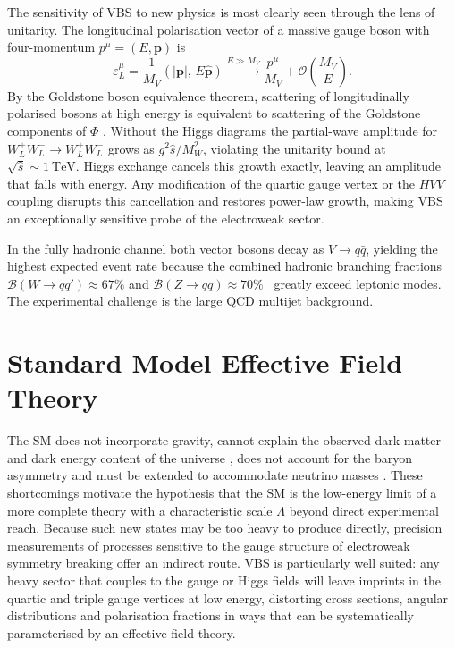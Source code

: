 The sensitivity of VBS to new physics is most clearly seen through the lens of unitarity. The longitudinal polarisation vector of a massive gauge boson with four-momentum $p^{\mu}=(E,\mathbf{p})$ is
\begin{equation}
\varepsilon_{L}^{\mu} = \frac{1}{M_{V}}\!\left(|\mathbf{p}|,\, E\hat{\mathbf{p}}\right) \xrightarrow{E\gg M_{V}} \frac{p^{\mu}}{M_{V}} + \mathcal{O}\!\left(\frac{M_{V}}{E}\right).
\end{equation}
By the Goldstone boson equivalence theorem, scattering of longitudinally polarised bosons at high energy is equivalent to scattering of the Goldstone components of $\Phi$ \cite{LlewellynSmith_Unitarity_1973, Cornwall_Unitarity_1974}. Without the Higgs diagrams the partial-wave amplitude for $W_{L}^{+}W_{L}^{-}\to W_{L}^{+}W_{L}^{-}$ grows as $g^{2}\hat{s}/M_{W}^{2}$, violating the unitarity bound at $\sqrt{\hat{s}}\sim 1\ \mathrm{TeV}$. Higgs exchange cancels this growth exactly, leaving an amplitude that falls with energy. Any modification of the quartic gauge vertex or the $HVV$ coupling disrupts this cancellation and restores power-law growth, making VBS an exceptionally sensitive probe of the electroweak sector.

In the fully hadronic channel both vector bosons decay as $V\to q\bar{q}$, yielding the highest expected event rate because the combined hadronic branching fractions $\mathcal{B}(W\to qq')\approx 67\%$ and $\mathcal{B}(Z\to qq)\approx 70\%$~\cite{ParticleDataGroup:2024cfk} greatly exceed leptonic modes. The experimental challenge is the large QCD multijet background.

\section{Standard Model Effective Field Theory}

The SM does not incorporate gravity, cannot explain the observed dark matter and dark energy content of the universe \cite{Riess_DE_1998, RubinFordThonnard_DM_1980}, does not account for the baryon asymmetry \cite{Gavela_CP_1994} and must be extended to accommodate neutrino masses \cite{Fukuda_Nu_1998, Ahmad_SNO_2001}. These shortcomings motivate the hypothesis that the SM is the low-energy limit of a more complete theory with a characteristic scale $\Lambda$ beyond direct experimental reach. Because such new states may be too heavy to produce directly, precision measurements of processes sensitive to the gauge structure of electroweak symmetry breaking offer an indirect route. VBS is particularly well suited: any heavy sector that couples to the gauge or Higgs fields will leave imprints in the quartic and triple gauge vertices at low energy, distorting cross sections, angular distributions and polarisation fractions in ways that can be systematically parameterised by an effective field theory.

